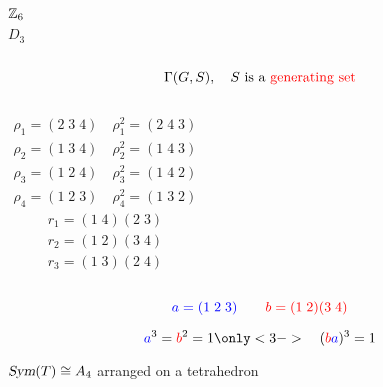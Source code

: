\begin{frame}
  \begin{center}
  \end{center}
\end{frame}

\begin{frame}
  \begin{columns}
	  \[
		\mathbb{Z}_{6}
	  \]
	  \[
		D_3
	  \]
  \end{columns}

  \pause
  \vspace{0.50cm}
  \[
	\Gamma(G, S),\quad S \text{ is a \textcolor{red}{generating set}}
  \]
\end{frame}

\begin{frame}
  \begin{columns}
	  \begin{align*}
		\rho_{1} = (2\; 3\; 4)\quad \rho_{1}^{2} = (2\; 4\; 3) \\[3pt]
		\rho_{2} = (1\; 3\; 4)\quad \rho_{2}^{2} = (1\; 4\; 3) \\[3pt]
		\rho_{3} = (1\; 2\; 4)\quad \rho_{3}^{2} = (1\; 4\; 2) \\[3pt]
		\rho_{4} = (1\; 2\; 3)\quad \rho_{4}^{2} = (1\; 3\; 2)
	  \end{align*}
	  \begin{align*}
		r_1 = (1\; 4) (2\; 3) \\[6pt]
		r_2 = (1\; 2) (3\; 4) \\[6pt]
		r_3 = (1\; 3) (2\; 4)
	  \end{align*}
  \end{columns}

  \pause
  \vspace{0.60cm}
  \[
	\textcolor{blue}{a = (1\; 2\; 3)} \qquad \textcolor{red}{b = (1\; 2) (3\; 4)}
  \]
\end{frame}

\begin{frame}
  \begin{center}
	\resizebox{0.70\textwidth}{!}{}
  \end{center}

  \vspace{-0.80cm}
  \[
	\blue{a}^3 = \red{b}^2 = 1 \only<3->{\quad (\red{b}\blue{a})^3 = 1}
  \]
\end{frame}

\begin{frame}

  \begin{center}
	$\textsl{Sym}(T) \cong A_4$ arranged on a  tetrahedron
  \end{center}
\end{frame}
